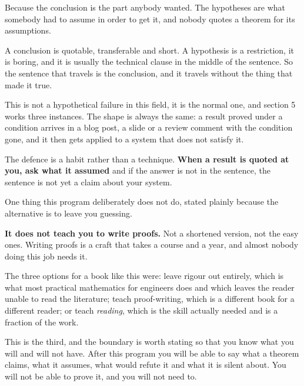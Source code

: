 \begin{fr}
\begin{ansblock}
Because the conclusion is the part anybody wanted. The hypotheses are what
somebody had to assume in order to get it, and nobody quotes a theorem for its
assumptions.
\end{ansblock}

A conclusion is quotable, transferable and short. A hypothesis is a
restriction, it is boring, and it is usually the technical clause in the middle
of the sentence. So the sentence that travels is the conclusion, and it travels
without the thing that made it true.

\begin{aibox}
This is not a hypothetical failure in this field, it is the normal one, and
section 5 works three instances. The shape is always the same: a result proved
under a condition arrives in a blog post, a slide or a review comment with the
condition gone, and it then gets applied to a system that does not satisfy it.

The defence is a habit rather than a technique. \textbf{When a result is
quoted at you, ask what it assumed} \dash{} and if the answer is not in the
sentence, the sentence is not yet a claim about your system.
\end{aibox}
\end{fr}

\begin{fr}
One thing this program deliberately does not do, stated plainly because the
alternative is to leave you guessing.

\textbf{It does not teach you to write proofs.} Not a shortened version, not
the easy ones. Writing proofs is a craft that takes a course and a year, and
almost nobody doing this job needs it.

\begin{rigourbox}
The three options for a book like this were: leave rigour out entirely, which
is what most practical mathematics for engineers does and which leaves the
reader unable to read the literature; teach proof-writing, which is a
different book for a different reader; or teach \emph{reading}, which is the
skill actually needed and is a fraction of the work.

This is the third, and the boundary is worth stating so that you know what you
will and will not have. After this program you will be able to say what a
theorem claims, what it assumes, what would refute it and what it is silent
about. You will not be able to prove it, and you will not need to.
\end{rigourbox}
\end{fr}

